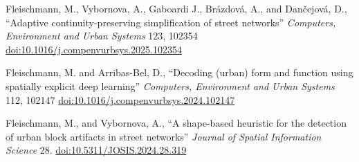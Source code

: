 \documentclass[11pt,a4paper]{report}
\begin{document}
\begin{tablist}
        \item[2026] \tab{}Fleischmann, M., Vybornova, A., Gaboardi J., Brázdová, A., and Dančejová, D., \enquote{Adaptive continuity-preserving simplification of street networks} \textit{Computers, Environment and Urban Systems} 123, 102354 \href{https://doi.org/10.1016/j.compenvurbsys.2025.102354}{doi:10.1016/j.compenvurbsys.2025.102354}



        \item[2024] \tab{}Fleischmann, M. and Arribas-Bel, D., \enquote{Decoding (urban) form and function using spatially explicit deep learning} \textit{Computers, Environment and Urban Systems} 112, 102147 \href{https://doi.org/10.1016/j.compenvurbsys.2024.102147}{doi:10.1016/j.compenvurbsys.2024.102147}

        \item[2024] \tab{}Fleischmann, M., and Vybornova, A., \enquote{A shape-based heuristic for the detection of urban block artifacts in street networks} \textit{Journal of Spatial Information Science} 28. \href{https://doi.org/10.5311/JOSIS.2024.28.319}{doi:10.5311/JOSIS.2024.28.319}




\end{tablist}
\end{document}
